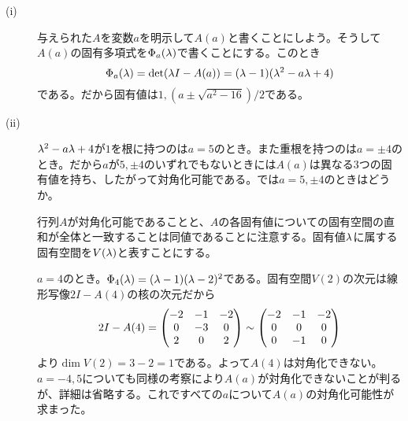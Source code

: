 \subsubsection{} %
\begin{sol} ${}$
  \begin{description}
\item[(i)] 与えられた$A$を変数$a$を明示して$A(a)$と書くことにしよう。そうして$A(a)$の固有多項式を$\Phi_a({\lambda})$で書くことにする。このとき
\[
\Phi_a({\lambda}) = \det({\lambda} I - A(a)) = ({\lambda} - 1)({\lambda}^2 - a {\lambda} + 4)
\]
である。だから固有値は$1, (a \pm \sqrt{a^2 - 16})/2$である。
\item[(ii)] ${\lambda}^2 - a {\lambda} + 4$が$1$を根に持つのは$a=5$のとき。また重根を持つのは$a=\pm 4$のとき。だから$a$が$5, \pm 4$のいずれでもないときには$A(a)$は異なる$3$つの固有値を持ち、したがって対角化可能である。では$a =5, \pm 4 $のときはどうか。

行列$A$が対角化可能であることと、$A$の各固有値についての固有空間の直和が全体と一致することは同値であることに注意する。固有値${\lambda}$に属する固有空間を$V({\lambda})$と表すことにする。

$a=4$のとき。$\Phi_4 ({\lambda})= ({\lambda}-1)({\lambda}-2)^2 $である。固有空間$V(2)$の次元は線形写像$2 I - A(4)$の核の次元だから
\[
2 I - A(4) = \begin{pmatrix} 
-2& -1& -2 \\
0 &-3& 0 \\
2 &0& 2
 \end{pmatrix}
\sim
\begin{pmatrix} 
-2 &-1& -2 \\
0 &0& 0 \\
0& -1& 0
 \end{pmatrix}
\]
より$\dim V(2) = 3 - 2 = 1$である。よって$A(4)$は対角化できない。$a=-4, 5$についても同様の考察により$A(a)$が対角化できないことが判るが、詳細は省略する。これですべての$a$について$A(a)$の対角化可能性が求まった。
  \end{description}
\end{sol}

\newpage

